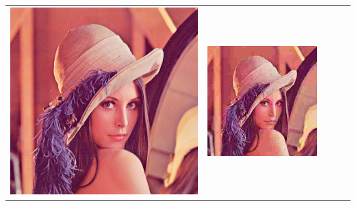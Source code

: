 \documentclass{beamer}
\begin{document}
\begin{frame}
  \begin{tabular}{ccccc}
    \includegraphics[scale=.1]{../images/60.png} &
    \includegraphics[scale=.1]{../images/61.jpg} &

\end{tabular}
\end{frame}
\end{document}
